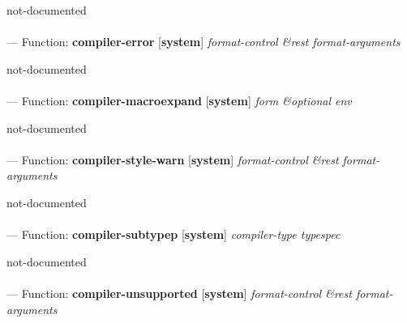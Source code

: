 \begin{adjustwidth}{5em}{5em}
not-documented
\end{adjustwidth}

\paragraph{}
\label{SYSTEM:COMPILER-ERROR}
--- Function: \textbf{compiler-error} [\textbf{system}] \textit{format-control \&rest format-arguments}

\begin{adjustwidth}{5em}{5em}
not-documented
\end{adjustwidth}

\paragraph{}
\label{SYSTEM:COMPILER-MACROEXPAND}
--- Function: \textbf{compiler-macroexpand} [\textbf{system}] \textit{form \&optional env}

\begin{adjustwidth}{5em}{5em}
not-documented
\end{adjustwidth}

\paragraph{}
\label{SYSTEM:COMPILER-STYLE-WARN}
--- Function: \textbf{compiler-style-warn} [\textbf{system}] \textit{format-control \&rest format-arguments}

\begin{adjustwidth}{5em}{5em}
not-documented
\end{adjustwidth}

\paragraph{}
\label{SYSTEM:COMPILER-SUBTYPEP}
--- Function: \textbf{compiler-subtypep} [\textbf{system}] \textit{compiler-type typespec}

\begin{adjustwidth}{5em}{5em}
not-documented
\end{adjustwidth}

\paragraph{}
\label{SYSTEM:COMPILER-UNSUPPORTED}
--- Function: \textbf{compiler-unsupported} [\textbf{system}] \textit{format-control \&rest format-arguments}

